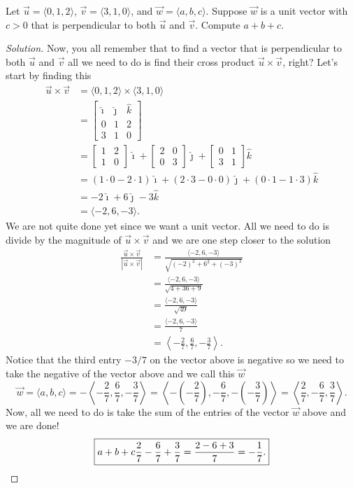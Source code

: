 \begin{problem}
Let $\vec u=\langle 0,1,2\rangle$, $\vec v=\langle 3,1,0\rangle$, and $\vec
w=\langle a,b,c\rangle$. Suppose $\vec w$ is a unit vector with $c>0$ that
is perpendicular to both $\vec u$ and $\vec v$. Compute $a+b+c$.
\end{problem}
\begin{proof}[Solution]
Now, you all remember that to find a vector that is perpendicular to both
$\vec u$ and $\vec v$ all we need to do is find their cross product $\vec
u\times \vec v$, right? Let's start by finding this
\begingroup
\allowdisplaybreaks
\begin{align*}
\vec u\times\vec v
&=\langle 0,1,2\rangle\times\langle 3,1,0\rangle\\
&=\begin{bmatrix}
\hat\imath&\hat\jmath&\hat k\\
0&1&2\\
3&1&0
\end{bmatrix}\\
&=\begin{bmatrix}
1&2\\1&0
\end{bmatrix}\hat\imath
+\begin{bmatrix}
2&0\\
0&3
\end{bmatrix}\hat\jmath
+\begin{bmatrix}
0&1\\
3&1
\end{bmatrix}\hat k\\
&=(1\cdot 0-2\cdot 1)\hat\imath+(2\cdot 3-0\cdot 0)\hat\jmath+(0\cdot
  1-1\cdot 3)\hat k\\
&=-2\hat\imath+6\hat\jmath-3\hat k\\
&=\langle -2,6,-3\rangle.
\end{align*}
\endgroup
We are not quite done yet since we want a unit vector. All we need to do is
divide by the magnitude of $\vec u\times\vec v$ and we are one step closer
to the solution
\begingroup
\allowdisplaybreaks
\begin{align*}
\frac{\vec u\times\vec v}{\left|\vec u\times\vec v\right|}
&=\frac{\langle -2,6,-3\rangle}{\sqrt{(-2)^2+6^2+(-3)^2}}\\
&=\frac{\langle -2,6,-3\rangle}{\sqrt{4+36+9}}\\
&=\frac{\langle -2,6,-3\rangle}{\sqrt{49}}\\
&=\frac{\langle -2,6,-3\rangle}{7}\\
&=\left<-\frac{2}{7},\frac{6}{7},-\frac{3}{7}\right>.
\end{align*}
\endgroup
Notice that the third entry $-3/7$ on the vector above is negative so we
need to take the negative of the vector above and we call this $\vec w$
\[
\vec w
=\langle a,b,c\rangle=-\left<-\frac{2}{7},\frac{6}{7},-\frac{3}{7}\right>
=\left<-\left(-\frac{2}{7}\right),-\frac{6}{7},-\left(-\frac{3}{7}\right)\right>
=\left<\frac{2}{7},-\frac{6}{7},\frac{3}{7}\right>.
\]
Now, all we need to do is take the sum of the entries of the vector
$\vec w$ above and we are done!
\[
\boxed{a+b+c\frac{2}{7}-\frac{6}{7}+\frac{3}{7}=
\frac{2-6+3}{7}=
-\frac{1}{7}.}\qedhere
\]
\end{proof}

